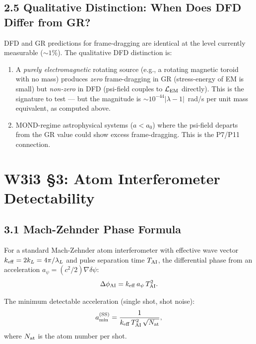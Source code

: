 \documentclass[11pt,twocolumn]{article}
\newcommand{\dpsi}{\delta\psi}
\newcommand{\lam}{\lambda}
\begin{document}
\subsection*{2.5 Qualitative Distinction: When Does DFD Differ from GR?}

DFD and GR predictions for frame-dragging are identical at the level
currently measurable ($\sim1\%$). The qualitative DFD distinction is:
\begin{enumerate}[nosep]
\item A \emph{purely electromagnetic} rotating source (e.g., a rotating
  magnetic toroid with no mass) produces \emph{zero} frame-dragging in GR
  (stress-energy of EM is small) but \emph{non-zero} in DFD (psi-field
  couples to $\mathcal{L}_{\rm EM}$ directly). This is the signature
  to test --- but the magnitude is $\sim 10^{-44}|\lam-1|$~rad/s per unit
  mass equivalent, as computed above.
\item MOND-regime astrophysical systems ($a < a_0$) where the psi-field
  departs from the GR value could show excess frame-dragging. This is
  the P7/P11 connection.
\end{enumerate}

\section*{W3i3 \S3: Atom Interferometer Detectability}
\label{sec:aion}

\subsection*{3.1 Mach-Zehnder Phase Formula}

For a standard Mach-Zehnder atom interferometer with effective wave
vector $k_{\rm eff} = 2k_L = 4\pi/\lambda_L$ and pulse separation time
$T_{\rm AI}$, the differential phase from an acceleration $a_\psi
= (c^2/2)\nabla\dpsi$:
\begin{equation}
\Delta\phi_{\rm AI} = k_{\rm eff}\,a_\psi\,T_{\rm AI}^2.
\label{eq:AI_phase}
\end{equation}

The minimum detectable acceleration (single shot, shot noise):
\begin{equation}
a_{\min}^{(\rm SS)} = \frac{1}{k_{\rm eff}\,T_{\rm AI}^2\,\sqrt{N_{\rm at}}},
\label{eq:a_min_SS}
\end{equation}
where $N_{\rm at}$ is the atom number per shot.
\end{document}

